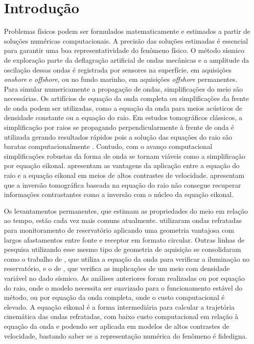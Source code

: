 \chapter{Introdução}
\label{ch:introducao}

Problemas físicos podem ser formulados matematicamente e estimados a partir de soluções numéricas computacionais. A precisão das soluções estimadas é essencial para garantir uma boa representatividade do fenômeno físico. O método sísmico de exploração parte da deflagração artificial de ondas mecânicas e a amplitude da oscilação dessas ondas é registrada por sensores na superfície, em aquisições \textit{onshore} e \textit{offshore}, ou no fundo marinho, em aquisições \textit{offshore} permanentes. Para simular numericamente a propagação de ondas, simplificações do meio são necessárias. Os artifícios de equação da onda completa ou simplificações da frente de onda podem ser utilizadas, como a equação da onda para meios acústicos de densidade constante ou a equação do raio. Em estudos tomográficos clássicos, a simplificação por raios se propagando perpendicularmente à frente de onda é utilizada gerando resultados rápidos pois a solução das equações do raio são baratas computacionalmente \cite{zhang1998nonlinear}. Contudo, com o avanço computacional simplificações robustas da forma de onda se tornam viáveis como a simplificação por equação eikonal.  apresentam as vantagens da aplicação entre a equação do raio e a equação eikonal em meios de altos contrastes de velocidade.  apresentam que a inversão tomográfica baseada na equação do raio não consegue recuperar informações contrastantes como a inversão com o núcleo da equação eikonal.  

Os levantamentos permanentes, que estimam as propriedades do meio em relação ao tempo, estão cada vez mais comuns atualmente.  utilizaram ondas refratadas para monitoramento de reservatório aplicando uma geometria vantajosa com largos afastamentos entre fonte e receptor em formato circular. Outras linhas de pesquisa utilizando esse mesmo tipo de geometria de aquisição se consolidaram como o trabalho de , que utiliza a equação da onda para verificar a iluminação no reservatório, e o de , que verifica as implicações de um meio com densidade variável no dado sísmico. As análises anteriores foram realizadas ou por equação do raio, onde o modelo necessita ser suavizado para o funcionamento estável do método, ou por equação da onda completa, onde o custo computacional é elevado. A equação eikonal é a forma intermediária para calcular a trajetória cinemática das ondas refratadas, com baixo custo computacional em relação à equação da onda e podendo ser aplicada em modelos de altos contrastes de velocidade, bastando saber se a representação numérica do fenômeno é fidedigna. 

